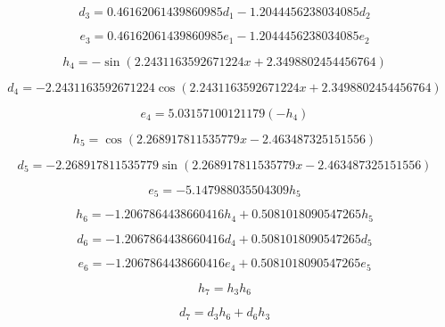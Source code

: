 \begin{equation}
d_{3}=0.46162061439860985 d_{1} - 1.2044456238034085 d_{2}
\end{equation}


\begin{equation}
e_{3}=0.46162061439860985 e_{1} - 1.2044456238034085 e_{2}
\end{equation}


\begin{equation}
h_{4}=- \sin{\left(2.2431163592671224 x + 2.3498802454456764 \right)}
\end{equation}


\begin{equation}
d_{4}=- 2.2431163592671224 \cos{\left(2.2431163592671224 x + 2.3498802454456764 \right)}
\end{equation}


\begin{equation}
e_{4}=5.03157100121179 (-h_{4})
\end{equation}


\begin{equation}
h_{5}=\cos{\left(2.268917811535779 x - 2.463487325151556 \right)}
\end{equation}


\begin{equation}
d_{5}=- 2.268917811535779 \sin{\left(2.268917811535779 x - 2.463487325151556 \right)}
\end{equation}


\begin{equation}
e_{5}=- 5.147988035504309 h_{5}
\end{equation}


\begin{equation}
h_{6}=- 1.2067864438660416 h_{4} + 0.5081018090547265 h_{5}
\end{equation}


\begin{equation}
d_{6}=- 1.2067864438660416 d_{4} + 0.5081018090547265 d_{5}
\end{equation}


\begin{equation}
e_{6}=- 1.2067864438660416 e_{4} + 0.5081018090547265 e_{5}
\end{equation}


\begin{equation}
h_{7}=h_{3} h_{6}
\end{equation}


\begin{equation}
d_{7}=d_{3} h_{6} + d_{6} h_{3}
\end{equation}


